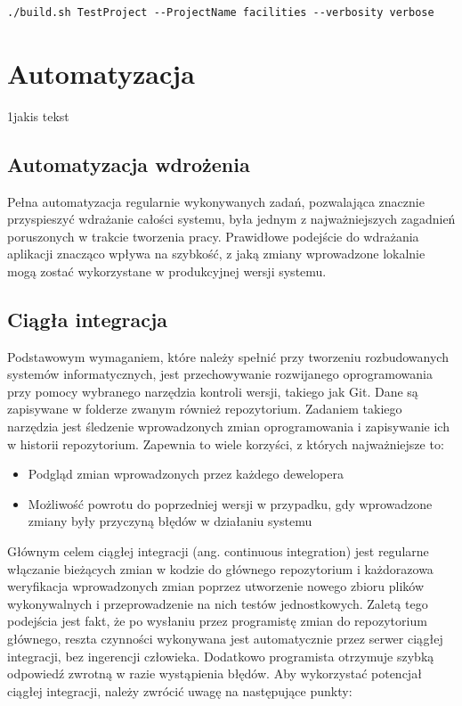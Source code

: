 \documentclass[11pt, a4]{article} %
\begin{document}
\begin{lstlisting}
./build.sh TestProject --ProjectName facilities --verbosity verbose
\end{lstlisting}

\section{Automatyzacja}
1jakis tekst
\subsection{Automatyzacja wdrożenia}

Pełna automatyzacja regularnie wykonywanych zadań, pozwalająca znacznie przyspieszyć 
wdrażanie całości systemu, była jednym z najważniejszych zagadnień poruszonych w 
trakcie tworzenia pracy. Prawidłowe podejście do wdrażania aplikacji znacząco wpływa 
na szybkość, z jaką zmiany wprowadzone lokalnie mogą zostać wykorzystane w 
produkcyjnej wersji systemu. 

\subsection{Ciągła integracja}

Podstawowym wymaganiem, które należy spełnić przy tworzeniu rozbudowanych systemów 
informatycznych, jest przechowywanie rozwijanego oprogramowania przy pomocy wybranego 
narzędzia kontroli wersji, takiego jak Git. Dane są zapisywane w folderze zwanym 
również repozytorium. Zadaniem takiego narzędzia jest śledzenie wprowadzonych zmian 
oprogramowania i zapisywanie ich w historii repozytorium. Zapewnia to wiele 
korzyści, z których najważniejsze to:

\begin{itemize} %
    \item Podgląd zmian wprowadzonych przez każdego dewelopera
    \item Możliwość powrotu do poprzedniej wersji w przypadku, gdy wprowadzone zmiany 
    były przyczyną błędów w działaniu systemu
\end{itemize}

Głównym celem ciągłej integracji (ang. continuous integration) jest regularne włączanie 
bieżących zmian w kodzie do głównego repozytorium i każdorazowa weryfikacja 
wprowadzonych zmian poprzez utworzenie nowego zbioru plików wykonywalnych 
i przeprowadzenie na nich testów jednostkowych. Zaletą tego podejścia jest fakt, że 
po wysłaniu przez programistę zmian do repozytorium głównego, reszta czynności 
wykonywana jest automatycznie przez serwer ciągłej integracji, bez ingerencji 
człowieka. Dodatkowo programista otrzymuje szybką odpowiedź zwrotną w razie 
wystąpienia błędów.
Aby wykorzystać potencjał ciągłej integracji, należy zwrócić uwagę na następujące 
punkty: 
\end{document}
